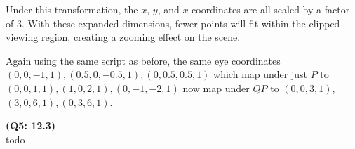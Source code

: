 \documentclass[letterpaper, 11pt]{article}
\begin{document}
Under this transformation, the $x$, $y$, and $x$ coordinates are all scaled by a factor of $3$. With these expanded dimensions, fewer points will fit within the clipped viewing region, creating a zooming effect on the scene.

\medskip
Again using the same script as before, the same eye coordinates $(0, 0,-1, 1), (0.5, 0, -0.5, 1), (0, 0.5, 0.5, 1)$ which map under just $P$ to $(0, 0, 1, 1), (1, 0, 2, 1), (0, -1, -2, 1)$ now map under $QP$ to $(0, 0, 3, 1)$, $(3, 0, 6, 1), (0, 3, 6, 1)$. 


\medskip
\textbf{(Q5: 12.3)} \\ 
todo
\end{document}

